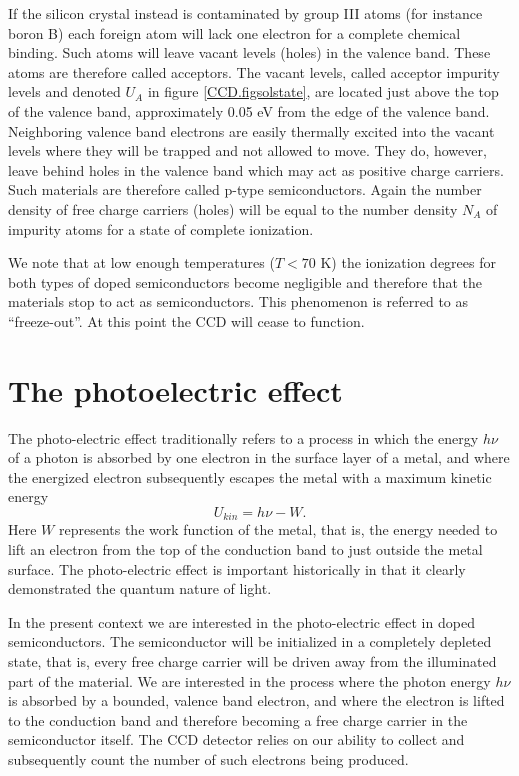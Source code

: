 If the silicon crystal instead is contaminated by group III atoms (for
instance boron B) each foreign atom will lack one electron for a
complete chemical binding. Such atoms will leave vacant levels (holes)
in the valence band. These atoms are therefore called acceptors.  The
vacant levels, called acceptor impurity levels and denoted $U_A$ in
figure \ref{CCD.figsolstate}, are located just above the top of the
valence band, approximately 0.05 eV from the edge of the valence band.
Neighboring valence band electrons are easily thermally excited into
the vacant levels where they will be trapped and not allowed to
move. They do, however, leave behind holes in the valence band which
may act as positive charge carriers. Such materials are therefore
called p-type semiconductors. Again the number density of free charge
carriers (holes) will be equal to the number density $N_A$ of impurity
atoms for a state of complete ionization.

We note that at low enough temperatures ($T < 70$ K) the ionization
degrees for both types of doped semiconductors become negligible and
therefore that the materials stop to act as semiconductors. This
phenomenon is referred to as ``freeze-out''. At this point the CCD
will cease to function.

\section{The photoelectric effect}

The photo-electric effect traditionally refers to a process in which
the energy $h\nu$ of a photon is absorbed by one electron in the
surface layer of a metal, and where the energized electron
subsequently escapes the metal with a maximum kinetic energy
\begin{equation}
  U_{kin} = h\nu - W.
\end{equation}
Here $W$ represents the work function of the metal, that is, the
energy needed to lift an electron from the top of the conduction band
to just outside the metal surface. The photo-electric effect is
important historically in that it clearly demonstrated the quantum
nature of light.

In the present context we are interested in the photo-electric effect
in doped semiconductors. The semiconductor will be initialized in a
completely depleted state, that is, every free charge carrier will be
driven away from the illuminated part of the material. We are
interested in the process where the photon energy $h\nu$ is absorbed
by a bounded, valence band electron, and where the electron is
lifted to the conduction band and therefore becoming a free charge
carrier in the semiconductor itself. The CCD detector relies on our 
ability to collect and subsequently count the number of such electrons
being produced.

